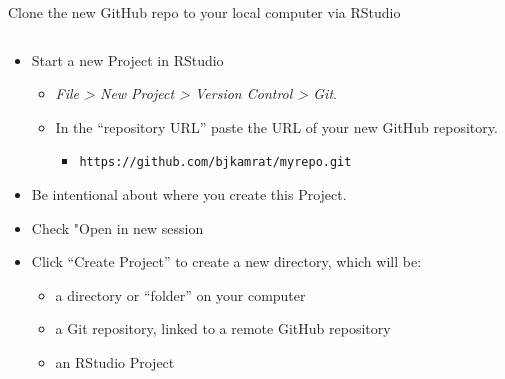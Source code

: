 \documentclass[
  ignorenonframetext,
]{beamer}
\providecommand{\tightlist}{%
  \setlength{\itemsep}{0pt}\setlength{\parskip}{0pt}}
\begin{document}
\begin{frame}[fragile]{Clone the new GitHub repo to your local computer
via RStudio}
\protect\hypertarget{clone-the-new-github-repo-to-your-local-computer-via-rstudio}{}

\begin{columns}[T]
\begin{column}{0.48\textwidth}
\begin{itemize}
\tightlist
\item
  Start a new Project in RStudio

  \begin{itemize}
  \tightlist
  \item
    \emph{File \textgreater{} New Project \textgreater{} Version Control
    \textgreater{} Git}.
  \item
    In the ``repository URL'' paste the URL of your new GitHub
    repository.

    \begin{itemize}
    \tightlist
    \item
      \texttt{https://github.com/bjkamrat/myrepo.git}
    \end{itemize}
  \end{itemize}
\item
  Be intentional about where you create this Project.
\item
  Check "Open in new session
\item
  Click ``Create Project'' to create a new directory, which will be:

  \begin{itemize}
  \tightlist
  \item
    a directory or ``folder'' on your computer
  \item
    a Git repository, linked to a remote GitHub repository
  \item
    an RStudio Project
  \end{itemize}
\end{itemize}
\end{column}


\end{columns}
\end{frame}
\end{document}
